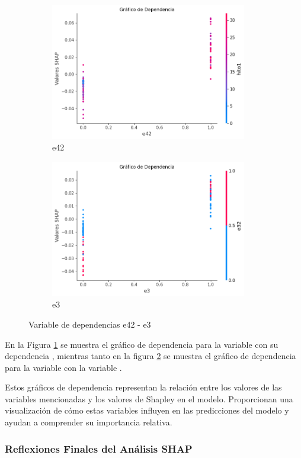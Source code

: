\begin{figure}[H]
    \begin{subfigure}{0.48\textwidth}
        \includegraphics[width=0.9\linewidth, height=6cm]{img/shap_rf/e42.png}
        \caption{e42}
        \label{fig:dependencia_e42}
    \end{subfigure}
    \begin{subfigure}{0.5\textwidth}
        \includegraphics[width=0.9\linewidth, height=6cm]{img/shap_rf/e3.png}
        \caption{e3}
        \label{fig:dependencia_e3}
    \end{subfigure}
    \caption{Variable de dependencias e42 - e3}
    \label{fig:image3}
\end{figure}

En la Figura \ref{fig:dependencia_e42} se muestra el gráfico de dependencia para la variable  con su dependencia , mientras tanto en la figura \ref{fig:dependencia_e3} se muestra el gráfico de dependencia para la variable  con la variable .

Estos gráficos de dependencia representan la relación entre los valores de las variables mencionadas y los valores de Shapley en el modelo. Proporcionan una visualización de cómo estas variables influyen en las predicciones del modelo y ayudan a comprender su importancia relativa.


\subsubsection{Reflexiones Finales del Análisis SHAP}

